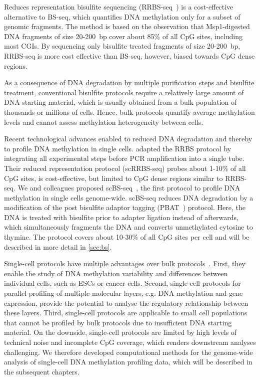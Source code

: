 Reduces representation bisulfite sequencing (RRBS-seq~\citep{meissner_genome-scale_2008-1,smith_high-throughput_2009}) is a cost-effective alternative to BS-seq, which quantifies DNA methylation only for a subset of genomic fragments. The method is based on the observation that Msp1-digested DNA fragments of size 20-200~bp cover about 85\% of all CpG sites, including most CGIs. By sequencing only bisulfite treated fragments of size 20-200~bp, RRBS-seq is more cost effective than BS-seq, however, biased towards CpG dense regions.

As a consequence of DNA degradation by multiple purification steps and bisulfite treatment, conventional bisulfite protocols require a relatively large amount of DNA starting material, which is usually obtained from a bulk population of thousands or millions of cells. Hence, bulk protocols quantify average methylation levels and cannot assess methylation heterogeneity between cells.

Recent technological advances enabled to reduced DNA degradation and thereby to profile DNA methylation in single cells. \citet{guo_profiling_2015} adapted the RRBS protocol by integrating all experimental steps before PCR amplification into a single tube. Their reduced representation protocol (scRRBS-seq) probes about 1-10\% of all CpG sites, is cost-effective, but limited to CpG dense regions similar to RRBS-seq. We and colleagues proposed scBS-seq~\citep{smallwood_single-cell_2014}, the first protocol to profile DNA methylation in single cells genome-wide. scBS-seq reduces DNA degradation by a modification of the post bisulfite adaptor tagging (PBAT~\citep{miura_amplification-free_2012-1}) protocol. Here, the DNA is treated with bisulfite prior to adapter ligation instead of afterwards, which simultaneously fragments the DNA and converts unmethylated cytosine to thymine. The protocol covers about 10-30\% of all CpG sites per cell and will be described in more detail in \cref{sec:bs}.

Single-cell protocols have multiple advantages over bulk protocols~\citep{schwartzman_single-cell_2015}. First, they enable the study of DNA methylation variability and differences between individual cells, such as ESCs or cancer cells. Second, single-cell protocols for parallel profiling of multiple molecular layers, e.g. DNA methylation and gene expression, provide the potential to analyse the regulatory relationship between these layers. Third, single-cell protocols are applicable to small cell populations that cannot be profiled by bulk protocols due to insufficient DNA starting material. On the downside, single-cell protocols are limited by high levels of technical noise and incomplete CpG coverage, which renders downstream analyses challenging. We therefore developed computational methods for the genome-wide analysis of single-cell DNA methylation profiling data, which will be described in the subsequent chapters.


